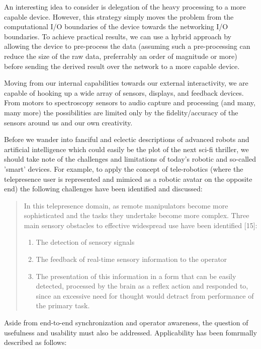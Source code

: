 \documentclass[a4paper,12pt]{report}
\begin{document}
An interesting idea to consider is delegation of the heavy processing to a more capable device. However, this strategy simply moves the problem from the computational I/O boundaries of the device towards the networking I/O boundaries. To achieve practical results, we can use a hybrid approach by allowing the device to pre-process the data (assuming such a pre-processing can reduce the size of the raw data, preferrably an order of magnitude or more) before sending the derived result over the network to a more capable device.

Moving from our internal capabilities towards our external interactivity, we are capable of hooking up a wide array of sensors, displays, and feedback devices. From motors to spectroscopy sensors to audio capture and processing (and many, many more) the possibilities are limited only by the fidelity/accuracy of the sensors around us and our own creativity.

Before we wander into fanciful and eclectic descriptions of advanced robots and artificial intelligence which could easily be the plot of the next sci-fi thriller, we should take note of the challenges and limitations of today's robotic and so-called 'smart' devices. For example, to apply the concept of tele-robotics (where the telepresence user is represented and mimiced as a robotic avatar on the opposite end) the following challenges have been identified and discussed:

\begin{quote}
In this telepresence domain, as remote manipulators become more sophisticated and the tasks they undertake become more complex. Three main sensory obstacles to effective widespread use have been identified [15]:
	\begin{enumerate}
		\item The detection of sensory signals
		\item The feedback of real-time sensory information to the operator
		\item The presentation of this information in a form that can be easily detected, processed by the brain as a reflex action and responded to, since an excessive need for thought would detract from performance of the primary task.
	\end{enumerate}
	\begin{flushright}
		\cite{540147}
	\end{flushright}
\end{quote}

Aside from end-to-end synchronization and operator awareness, the question of usefulness and usability must also be addressed. Applicability has been fomrmally described as follows:
\end{document}
